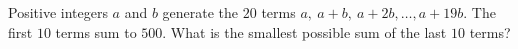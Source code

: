 Positive integers $a$ and $b$ generate the $20$ terms $a,\ a+b,\ a+2b,\dots,a+19b$. The first $10$ terms sum to $500$. What is the smallest possible sum of the last $10$ terms?
